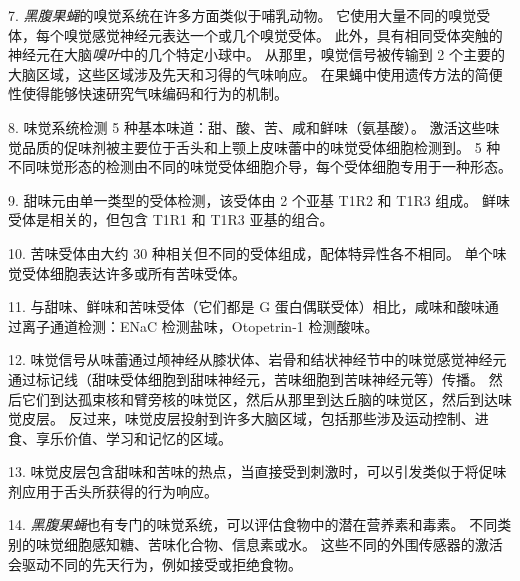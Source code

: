 7. \textit{黑腹果蝇}的嗅觉系统在许多方面类似于哺乳动物。
它使用大量不同的嗅觉受体，每个嗅觉感觉神经元表达一个或几个嗅觉受体。
此外，具有相同受体突触的神经元在大脑\textit{嗅叶}中的几个特定小球中。
从那里，嗅觉信号被传输到 2 个主要的大脑区域，这些区域涉及先天和习得的气味响应。
在果蝇中使用遗传方法的简便性使得能够快速研究气味编码和行为的机制。


8. 味觉系统检测 5 种基本味道：甜、酸、苦、咸和鲜味（氨基酸）。
激活这些味觉品质的促味剂被主要位于舌头和上颚上皮味蕾中的味觉受体细胞检测到。
5 种不同味觉形态的检测由不同的味觉受体细胞介导，每个受体细胞专用于一种形态。


9. 甜味元由单一类型的受体检测，该受体由 2 个亚基 T1R2 和 T1R3 组成。
鲜味受体是相关的，但包含 T1R1 和 T1R3 亚基的组合。


10. 苦味受体由大约 30 种相关但不同的受体组成，配体特异性各不相同。
单个味觉受体细胞表达许多或所有苦味受体。 


11. 与甜味、鲜味和苦味受体（它们都是 G 蛋白偶联受体）相比，咸味和酸味通过离子通道检测：ENaC 检测盐味，Otopetrin-1 检测酸味。 


12. 味觉信号从味蕾通过颅神经从膝状体、岩骨和结状神经节中的味觉感觉神经元通过标记线（甜味受体细胞到甜味神经元，苦味细胞到苦味神经元等）传播。
然后它们到达孤束核和臂旁核的味觉区，然后从那里到达丘脑的味觉区，然后到达味觉皮层。
反过来，味觉皮层投射到许多大脑区域，包括那些涉及运动控制、进食、享乐价值、学习和记忆的区域。


13. 味觉皮层包含甜味和苦味的热点，当直接受到刺激时，可以引发类似于将促味剂应用于舌头所获得的行为响应。 


14. \textit{黑腹果蝇}也有专门的味觉系统，可以评估食物中的潜在营养素和毒素。
不同类别的味觉细胞感知糖、苦味化合物、信息素或水。 
这些不同的外围传感器的激活会驱动不同的先天行为，例如接受或拒绝食物。


